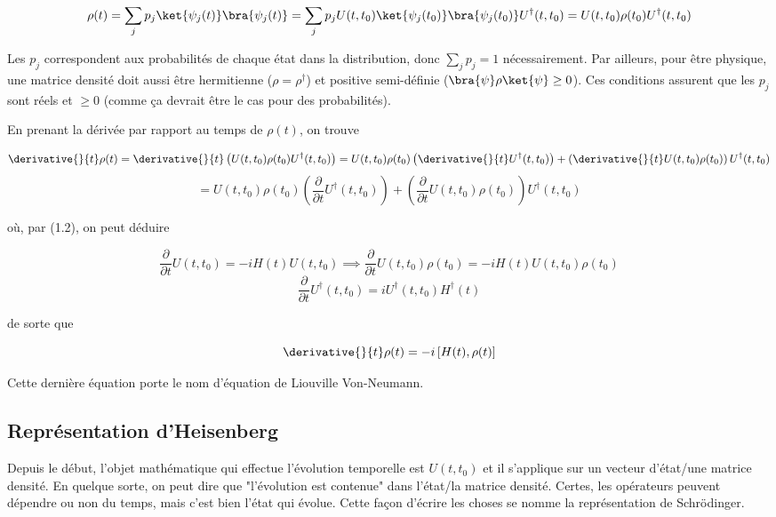 \begin{equation}
    \rho(t) = \sum_{j}^{}p_j \ket{\psi_j(t)}\bra{\psi_j(t)} = \sum_{j}^{}p_j U(t,t_0)\ket{\psi_j(t_0)}\bra{\psi_j(t_0)}U^{\dagger}(t,t_0) = U(t,t_0)\rho(t_0)U^{\dagger}(t,t_0)
\end{equation}

Les $p_j$ correspondent aux probabilités de chaque état dans la distribution, donc $\sum_{j}^{}p_j = 1$ nécessairement. Par ailleurs, pour être physique, une matrice densité doit aussi être hermitienne ($\rho = \rho^{\dagger}$) et positive semi-définie ($\bra{\psi}\rho\ket{\psi} \geq 0$). Ces conditions assurent que les $p_j$ sont réels et $\geq 0$ (comme ça devrait être le cas pour des probabilités).

En prenant la dérivée par rapport au temps de $\rho(t)$, on trouve 

\begin{equation*}
    \derivative{}{t}\rho(t) = \derivative{}{t}\left(U(t,t_0)\rho(t_0)U^{\dagger}(t,t_0)\right) = U(t,t_0)\rho(t_0)\left(\derivative{}{t}U^{\dagger}(t,t_0)\right) + \left(\derivative{}{t}U(t,t_0)\rho(t_0)\right)U^{\dagger}(t,t_0)
\end{equation*}
\begin{equation*}
    = U(t,t_0)\rho(t_0)\left(\frac{\partial}{\partial t}U^{\dagger}(t,t_0)\right) + \left(\frac{\partial}{\partial t}U(t,t_0)\rho(t_0)\right)U^{\dagger}(t,t_0)
\end{equation*}

où, par (1.2), on peut déduire

\begin{equation*}
    \frac{\partial}{\partial t}U(t,t_0) = -iH(t)U(t,t_0) \implies \frac{\partial}{\partial t}U(t,t_0)\rho(t_0) = -iH(t)U(t,t_0)\rho(t_0)
\end{equation*}
\begin{equation*}
    \frac{\partial}{\partial t}U^{\dagger}(t,t_0) = iU^{\dagger}(t,t_0)H^\dagger(t) 
\end{equation*}

de sorte que

\begin{equation}
    \derivative{}{t}\rho(t) = -i\left[H(t), \rho(t)\right]
\end{equation}

Cette dernière équation porte le nom d'équation de Liouville Von-Neumann.

\subsection{Représentation d'Heisenberg}
Depuis le début, l'objet mathématique qui effectue l'évolution temporelle est $U(t,t_0)$ et il s'applique sur un vecteur d'état/une matrice densité. En quelque sorte, on peut dire que "l'évolution est contenue" dans l'état/la matrice densité. Certes, les opérateurs peuvent dépendre ou non du temps, mais c'est bien l'état qui évolue. Cette façon d'écrire les choses se nomme la représentation de Schrödinger. 


